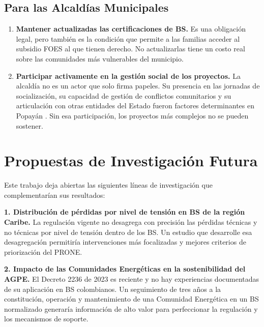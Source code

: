 \subsection{Para las Alcaldías Municipales}
\label{subsec:rec_alcaldias}

\begin{enumerate}[label=\textbf{\arabic*.}, leftmargin=1.8cm, itemsep=8pt]

    \item \textbf{Mantener actualizadas las certificaciones de BS.} Es
    una obligación legal, pero también es la condición que permite a las
    familias acceder al subsidio FOES al que tienen derecho. No
    actualizarlas tiene un costo real sobre las comunidades más
    vulnerables del municipio.

    \item \textbf{Participar activamente en la gestión social de los
    proyectos.} La alcaldía no es un actor que solo firma papeles. Su
    presencia en las jornadas de socialización, su capacidad de gestión
    de conflictos comunitarios y su articulación con otras entidades del
    Estado fueron factores determinantes en Popayán
    \parencite{SerranoRueda2019}. Sin esa participación, los proyectos
    más complejos no se pueden sostener.
\end{enumerate}


\section{Propuestas de Investigación Futura}
\label{sec:investigacion_futura}

Este trabajo deja abiertas las siguientes líneas de investigación que
complementarían sus resultados:

\textbf{1. Distribución de pérdidas por nivel de tensión en BS de la
región Caribe.} La regulación vigente no desagrega con precisión las
pérdidas técnicas y no técnicas por nivel de tensión dentro de los BS.
Un estudio que desarrolle esa desagregación permitiría intervenciones
más focalizadas y mejores criterios de priorización del PRONE.

\textbf{2. Impacto de las Comunidades Energéticas en la sostenibilidad
del AGPE.} El Decreto 2236 de 2023 es reciente y no hay experiencias
documentadas de su aplicación en BS colombianos. Un seguimiento de tres
años a la constitución, operación y mantenimiento de una Comunidad
Energética en un BS normalizado generaría información de alto valor para
perfeccionar la regulación y los mecanismos de soporte.

